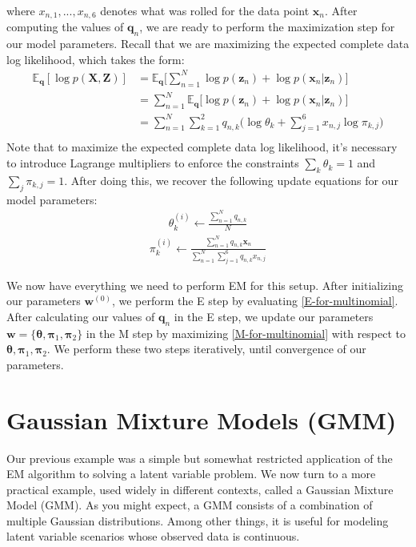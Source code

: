 where $x_{n,1}, ..., x_{n,6}$ denotes what was rolled for the data point $\textbf{x}_n$.
After computing the values of $\textbf{q}_n$, we are ready to perform the maximization step for our model parameters. Recall that we are maximizing the expected complete data log likelihood, which takes the form:
\begin{align} \label{M-for-multinomial}
    \mathbb{E}_{\textbf{q}}[\log p(\textbf{X}, \textbf{Z})] &= \mathbb{E}_{\textbf{q}} \bigg[\sum_{n=1}^{N} \log p(\textbf{z}_n) + \log p(\textbf{x}_n | \textbf{z}_n)\bigg] \\ 
    &= \sum_{n=1}^{N} \mathbb{E}_{\textbf{q}} \bigg[ \log p(\textbf{z}_n) + \log p(\textbf{x}_n | \textbf{z}_n)\bigg] \\ 
    &= \sum_{n=1}^{N} \sum_{k=1}^{2} q_{n, k} \bigg( \log \theta_k + \sum_{j=1}^{6} x_{n, j} \log \pi_{k, j} \bigg) \\ 
\end{align}
Note that to maximize the expected complete data log likelihood, it's necessary to introduce Lagrange multipliers to enforce the constraints $\sum_{k} \theta_k = 1$ and $\sum_{j} \pi_{k, j} = 1$. After doing this, we recover the following update equations for our model parameters:
\begin{align*}
    \theta_{k}^{(i)} \leftarrow \frac{\sum_{n=1}^{N} q_{n, k}}{N}
\end{align*}
\begin{align*}
    \pi_{k}^{(i)} \leftarrow \frac{\sum_{n=1}^{N} q_{n, k} \textbf{x}_{n}}{\sum_{n=1}^{N} \sum_{j=1}^{6} q_{n, k} x_{n, j}}
\end{align*}

We now have everything we need to perform EM for this setup. After initializing our parameters $\textbf{w}^{(0)}$, we perform the E step by evaluating \ref{E-for-multinomial}. After calculating our values of $\textbf{q}_n$ in the E step, we update our parameters $\textbf{w} = \{\boldsymbol{\theta}, \boldsymbol{\pi}_1, \boldsymbol{\pi}_2 \}$ in the M step by maximizing \ref{M-for-multinomial} with respect to $\boldsymbol{\theta}, \boldsymbol{\pi}_1, \boldsymbol{\pi}_2$. We perform these two steps iteratively, until convergence of our parameters.

\section{Gaussian Mixture Models (GMM)}
Our previous example was a simple but somewhat restricted application of the EM algorithm to solving a latent variable problem. We now turn to a more practical example, used widely in different contexts, called a Gaussian Mixture Model (GMM). As you might expect, a GMM consists of a combination of multiple Gaussian distributions. Among other things, it is useful for modeling latent variable scenarios whose observed data is continuous.

